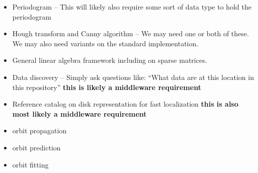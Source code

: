 \begin{itemize}
\item Periodogram -- This will likely also require some sort of data type to hold the periodogram
\item Hough transform and Canny algorithm -- We may need one or both of these.  We may also need variants on the standard implementation.
\item General linear algebra framework including on sparse matrices.
\item Data discovery -- Simply ask questions like: ``What data are at this location in this repository'' \textbf{this is likely a middleware requirement}
\item Reference catalog on disk representation for fast localization \textbf{this is also most likely a middleware requirement}
\item orbit propagation
\item orbit prediction
\item orbit fitting
\end{itemize}
